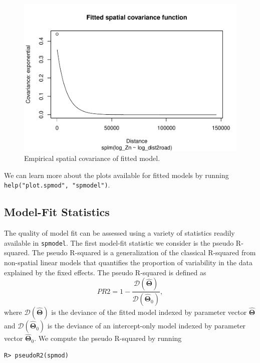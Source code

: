 \documentclass{article}
\begin{document}
\begin{figure}

{\centering \includegraphics[width=0.75\linewidth]{preprint_files/figure-latex/emp_spcov-1} 

}

\caption{Empirical spatial covariance of fitted model.}\label{fig:emp_spcov}
\end{figure}

We can learn more about the plots available for fitted models by running
\texttt{help("plot.spmod",\ "spmodel")}.

\hypertarget{model-fit-statistics}{%
\subsection{Model-Fit Statistics}\label{model-fit-statistics}}

The quality of model fit can be assessed using a variety of statistics
readily available in \texttt{spmodel}. The first model-fit statistic we
consider is the pseudo R-squared. The pseudo R-squared is a
generalization of the classical R-squared from non-spatial linear models
that quantifies the proportion of variability in the data explained by
the fixed effects. The pseudo R-squared is defined as \begin{equation*}
PR2 = 1 - \frac{\mathcal{D}(\boldsymbol{\hat{\Theta}})}{\mathcal{D}(\boldsymbol{\hat{\Theta}}_0)},
\end{equation*} where \(\mathcal{D}(\boldsymbol{\hat{\Theta}})\) is the
deviance of the fitted model indexed by parameter vector
\(\boldsymbol{\hat{\Theta}}\) and
\(\mathcal{D}(\boldsymbol{\hat{\Theta}}_0)\) is the deviance of an
intercept-only model indexed by parameter vector
\(\boldsymbol{\hat{\Theta}}_0\). We compute the pseudo R-squared by
running

\begin{verbatim}
R> pseudoR2(spmod)
\end{verbatim}
\end{document}
